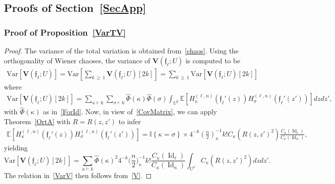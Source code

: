 \documentclass[10pt]{amsart}
\theoremstyle{definition}\newtheorem{defi}[theo]{Definition}\newtheorem{rema}[theo]{Remark}\newtheorem{exam}[theo]{Example}\newtheorem{exem}[theo]{Example}\newtheorem{nota}[theo]{Notation}
\DeclareMathOperator{\Id}{Id}
\newcommand{\bfv}{\mathbf{V}}
\newcommand{\frkf}{\mathfrak{f}}
\newcommand{\E}[1]{\mathbb{E}\left[#1\right]}
\newcommand{\V}[1]{\mathrm{Var}{\left[#1\right]}}
\newcommand{\ind}[1]{\mathbb{I}
\left\{#1\right\}}
\begin{document}
\subsection{Proofs of Section~\ref{SecApp}}
\subsubsection*{Proof of Proposition~\ref{VarTV}}

\begin{proof}
The variance of the total variation is obtained from~\eqref{chaos}. Using the orthogonality of Wiener chaoses, the variance of $\bfv(\frkf_{\ell};U)$ is computed to be
\begin{gather}\label{V}
\V{\bfv(\frkf_{\ell};U)} = \V{\sum_{k\,\geq\,1} \bfv\left(\frkf_{\ell};U\right)[2k]} = \sum_{k\,\geq\,1} \V{\bfv\left(\frkf_{\ell};U\right)[2k]}
\end{gather}
where
\begin{gather*}
\V{\bfv(\frkf_{\ell};U)[2k]} = \sum_{\kappa \vdash k} \sum_{\sigma \vdash k} \widehat{\Phi}(\kappa)\widehat{\Phi}(\sigma) \int_{U^2} \E{H_{\kappa}^{(\ell,n)}\left(\frkf_{\ell}'(z)\right) H_{\sigma}^{(\ell,n)}\left(\frkf_{\ell}'(z')\right) }dzdz',
\end{gather*}
with $\widehat{\Phi}(\kappa)$ as in~\eqref{ForId}. Now, in view of~\eqref{CovMatrix}, we can apply Theorem~\ref{OrtA} with $R=R(z,z')$ to infer
\begin{gather*}
\E{H_{\kappa}^{(\ell,n)}\left(\frkf_{\ell}'(z)\right) H_{\sigma}^{(\ell,n)}\left(\frkf_{\ell}'(z')\right)} = \ind{\kappa=\sigma}\times 4^{-k}\left(\frac{n}{2}\right)_{\kappa}^{-1} k ! C_{\kappa}\left(R(z,z')^2\right)\frac{C_{\kappa}(\Id_{\ell})}{C_{\kappa}(\Id_n)},
\end{gather*}
yielding
\[
\V{\bfv\left(\frkf_{\ell};U\right)[2k]} = \sum_{\kappa\vdash k} \widehat{\Phi}(\kappa)^2 4^{-k}\bigg(\frac{n}{2}\bigg)_{\kappa}^{-1} k !
\frac{C_{\kappa}(\Id_{\ell})}{C_{\kappa}(\Id_n)} \int_{U^2} C_{\kappa}\left(R(z,z')^2\right) dzdz'.
\]
The relation in~\eqref{VarV} then follows from~\eqref{V}.
\end{proof}
\end{document}
